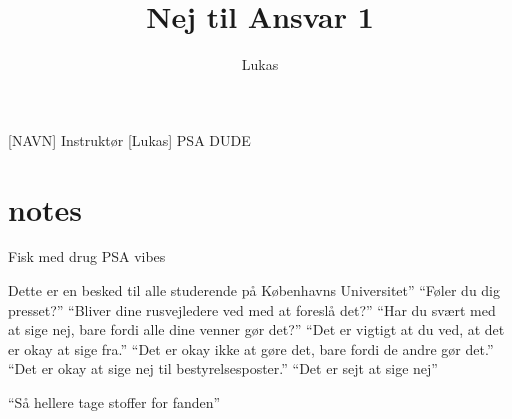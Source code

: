 \documentclass[a4paper,11pt]{article}
\title{Nej til Ansvar 1}
\author{Lukas}
\begin{document}
\maketitle

\begin{roles}
[NAVN] Instruktør
 [Lukas] PSA DUDE
\end{roles}

\begin{props}

\end{props}

\section*{notes}Fisk med drug PSA vibes


\begin{sketch}
Dette er en besked til alle studerende på Københavns Universitet”
“Føler du dig presset?”
“Bliver dine rusvejledere ved med at foreslå det?”
“Har du svært med at sige nej, bare fordi alle dine venner gør det?”
“Det er vigtigt at du ved, at det er okay at sige fra.”
“Det er okay ikke at gøre det, bare fordi de andre gør det.”
“Det er okay at sige nej til bestyrelsesposter.”
“Det er sejt at sige nej”

“Så hellere tage stoffer for fanden” 

\end{sketch}
\end{document}
